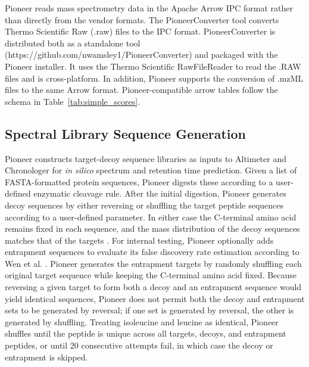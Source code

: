 \documentclass[pdflatex,sn-nature]{sn-jnl}
\begin{document}
Pioneer reads mass spectrometry data in the Apache Arrow IPC format rather than directly from the vendor formats. The PioneerConverter tool converts Thermo Scientific Raw (.raw) files to the IPC format.
PioneerConverter is distributed both as a standalone tool (https://github.com/nwamsley1/PioneerConverter) and packaged with the Pioneer installer. It uses the Thermo Scientific RawFileReader to read the .RAW files and is cross-platform. In addition, Pioneer supports the conversion of .mzML files to the same Arrow format. Pioneer-compatible arrow tables follow the schema in Table~\ref{tab:simple_scores}. 

\subsection{Spectral Library Sequence Generation}\label{subsec:spectral-library-sequence-generation}
Pioneer constructs target-decoy sequence libraries as inputs to Altimeter and Chronologer \cite{Wilburn2023-uk} for \textit{in silico} spectrum and retention time prediction. Given a list of FASTA-formatted protein sequences, Pioneer digests these according to a user-defined enzymatic cleavage rule. After the initial digestion, Pioneer generates decoy sequences by either reversing or shuffling the target peptide sequences according to a user-defined parameter. In either case the C-terminal amino acid remains fixed in each sequence, and the mass distribution of the decoy sequences matches that of the targets \cite{Freestone2023-ef}. For internal testing, Pioneer optionally adds entrapment sequences to evaluate its false discovery rate estimation according to Wen et al. \cite{Wen2025-mz}. Pioneer generates the entrapment targets by randomly shuffling each original target sequence while keeping the C-terminal amino acid fixed. Because reversing a given target to form both a decoy and an entrapment sequence would yield identical sequences, Pioneer does not permit both the decoy and entrapment sets to be generated by reversal; if one set is generated by reversal, the other is generated by shuffling. Treating isoleucine and leucine as identical, Pioneer shuffles until the peptide is unique across all targets, decoys, and entrapment peptides, or until 20 consecutive attempts fail, in which case the decoy or entrapment is skipped.

\end{document}
